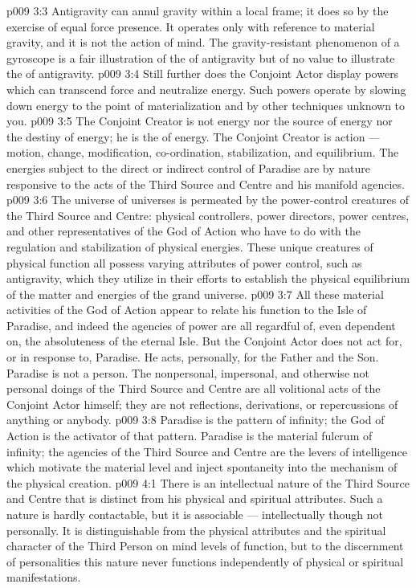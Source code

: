 \vs p009 3:3 \pc Antigravity can annul gravity within a local frame; it does so by the exercise of equal force presence. It operates only with reference to material gravity, and it is not the action of mind. The gravity\hyp{}resistant phenomenon of a gyroscope is a fair illustration of the  of antigravity but of no value to illustrate the  of antigravity.
\vs p009 3:4 Still further does the Conjoint Actor display powers which can transcend force and neutralize energy. Such powers operate by slowing down energy to the point of materialization and by other techniques unknown to you.
\vs p009 3:5 \pc The Conjoint Creator is not energy nor the source of energy nor the destiny of energy; he is the  of energy. The Conjoint Creator is action --- motion, change, modification, co\hyp{}ordination, stabilization, and equilibrium. The energies subject to the direct or indirect control of Paradise are by nature responsive to the acts of the Third Source and Centre and his manifold agencies.
\vs p009 3:6 The universe of universes is permeated by the power\hyp{}control creatures of the Third Source and Centre: physical controllers, power directors, power centres, and other representatives of the God of Action who have to do with the regulation and stabilization of physical energies. These unique creatures of physical function all possess varying attributes of power control, such as antigravity, which they utilize in their efforts to establish the physical equilibrium of the matter and energies of the grand universe.
\vs p009 3:7 All these material activities of the God of Action appear to relate his function to the Isle of Paradise, and indeed the agencies of power are all regardful of, even dependent on, the absoluteness of the eternal Isle. But the Conjoint Actor does not act for, or in response to, Paradise. He acts, personally, for the Father and the Son. Paradise is not a person. The nonpersonal, impersonal, and otherwise not personal doings of the Third Source and Centre are all volitional acts of the Conjoint Actor himself; they are not reflections, derivations, or repercussions of anything or anybody.
\vs p009 3:8 Paradise is the pattern of infinity; the God of Action is the activator of that pattern. Paradise is the material fulcrum of infinity; the agencies of the Third Source and Centre are the levers of intelligence which motivate the material level and inject spontaneity into the mechanism of the physical creation.
\vs p009 4:1 There is an intellectual nature of the Third Source and Centre that is distinct from his physical and spiritual attributes. Such a nature is hardly contactable, but it is associable --- intellectually though not personally. It is distinguishable from the physical attributes and the spiritual character of the Third Person on mind levels of function, but to the discernment of personalities this nature never functions independently of physical or spiritual manifestations.
